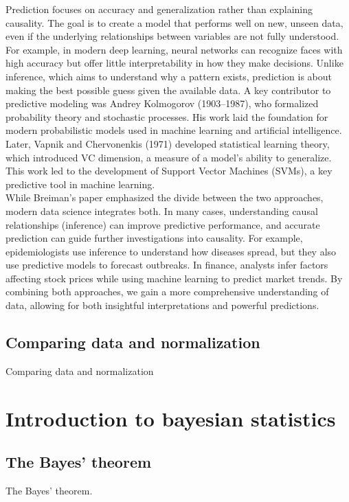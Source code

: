 \documentclass{book}
\begin{document}
Prediction focuses on accuracy and generalization rather than explaining causality. The goal is to create a model that performs well on new, unseen data, even if the underlying relationships between variables are not fully understood. For example, in modern deep learning, neural networks can recognize faces with high accuracy but offer little interpretability in how they make decisions. Unlike inference, which aims to understand why a pattern exists, prediction is about making the best possible guess given the available data. A key contributor to predictive modeling was Andrey Kolmogorov (1903–1987), who formalized probability theory and stochastic processes. His work laid the foundation for modern probabilistic models used in machine learning and artificial intelligence. Later, Vapnik and Chervonenkis (1971) developed statistical learning theory, which introduced VC dimension, a measure of a model’s ability to generalize. This work led to the development of Support Vector Machines (SVMs), a key predictive tool in machine learning.\\

While Breiman’s paper emphasized the divide between the two approaches, modern data science integrates both. In many cases, understanding causal relationships (inference) can improve predictive performance, and accurate prediction can guide further investigations into causality. For example, epidemiologists use inference to understand how diseases spread, but they also use predictive models to forecast outbreaks. In finance, analysts infer factors affecting stock prices while using machine learning to predict market trends. By combining both approaches, we gain a more comprehensive understanding of data, allowing for both insightful interpretations and powerful predictions.

\newpage
\section{Comparing data and normalization}
Comparing data and normalization

\chapter{Introduction to bayesian statistics}

\section{The Bayes' theorem}
The Bayes' theorem.
\end{document}
